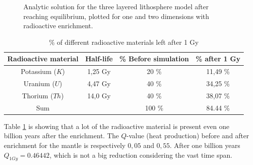 \documentclass[10pt,a4paper]{article}
\begin{document}
\begin{figure} [H]
	\centering
	\caption{\label{10analytic}Analytic solution for the three layered lithosphere model after reaching equilibrium, plotted for one and two dimensions with radioactive enrichment. }
\end{figure}



\begin{table} [H]
\centering
\caption{\% of different radioactive materials left after 1 Gy}
\begin{tabular}{|c|c|c|c|}
\hline
Radioactive material & Half-life & \% Before simulation & \% after 1 Gy\\
\hline
Potassium ($K$) 	 & 1,25 Gy   & 20 \% 				 & 11,49 \% \\
\hline
Uranium ($U$)	     & 4,47 Gy   & 40 \%				 & 34,25 \% \\
\hline
Thorium ($Th$)		 & 14,0 Gy	 & 40 \%				 & 38,07 \% \\
\hline
Sum					 & 			 & 100 \% 				 & 84.44 \%\\
\hline
\end{tabular}
\label{Decay}
\end{table}

\noindent Table \ref{Decay} is showing that a lot of the radioactive material is present even one billion years after the enrichment. The $Q$-value (heat production) before and after enrichment for the mantle is respectively $0,05$ and $0,55$. After one billion years $Q_{1Gy}=0.46442$, which is not a big reduction considering the vast time span.   
\end{document}
